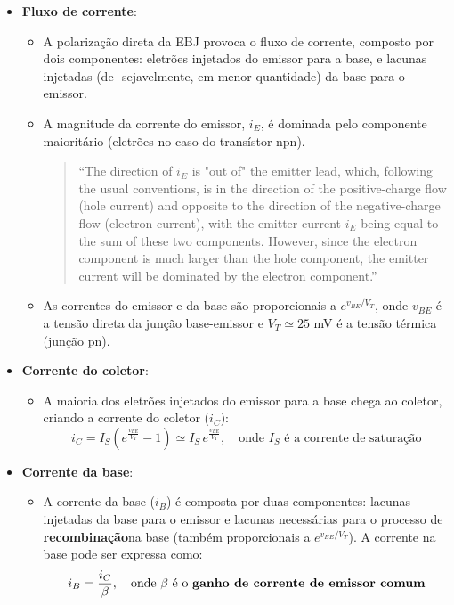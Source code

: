 \begin{itemize}[leftmargin=*]
    \item[] \textbf{Fluxo de corrente}:
    \begin{itemize}[leftmargin=*,label=$\pmb{-}$]
        \item A polarização direta da EBJ provoca o fluxo de corrente, composto por dois componentes: eletrões injetados do emissor para a base, e lacunas injetadas (de- sejavelmente, em menor quantidade) da base para o emissor.
        \item A magnitude da corrente do emissor, $i_E$, é dominada pelo componente maioritário (eletrões no caso do transístor npn).
        \begin{quote}
            ``The direction of $i_E$ is "out of" the emitter lead, which, following the usual conventions, is in the direction of the positive-charge flow (hole current) and opposite to the direction of the negative-charge flow (electron current), with the emitter current $i_E$ being equal to the sum of these two components. However, since the electron component is much larger than the hole component, the emitter current will be dominated by the electron component.''\cite{sedra-smith:microelectronic-circuits}
        \end{quote}
        \item As correntes do emissor e da base são proporcionais a $e^{v_\textit{BE}/V_T}$, onde $v_\textit{BE}$ é a tensão direta da junção base-emissor e $V_T \simeq 25$ mV é a tensão térmica (junção pn).
    \end{itemize}
    
    \item[] \textbf{Corrente do coletor}:
    \begin{itemize}[leftmargin=*,label=$\pmb{-}$]
        \item A maioria dos eletrões injetados do emissor para a base chega ao coletor, criando a corrente do coletor ($i_C$):
        $$
            i_C = I_S \left(e^{\frac{v_\textit{BE}}{V_T}} - 1\right) \simeq I_S\, e^{\frac{v_\textit{BE}}{V_T}},\quad \text{onde $I_S$ é a corrente de saturação}
        $$
    \end{itemize}
    
    \item[] \textbf{Corrente da base}:
    \begin{itemize}[leftmargin=*,label=$\pmb{-}$]
        \item A corrente da base ($i_B$) é composta por duas componentes: lacunas injetadas da base para o emissor e lacunas necessárias para o processo de \textbf{recombinação}\footnotemark[4] na base (também proporcionais a $e^{v_\textit{BE}/V_T}$). A corrente na base pode ser expressa como:
        $$
            i_B = \frac{i_C}{\beta},\quad \text{onde $\beta$ é o \textbf{ganho de corrente de emissor comum}}
        $$
    \end{itemize}
    

\end{itemize}
